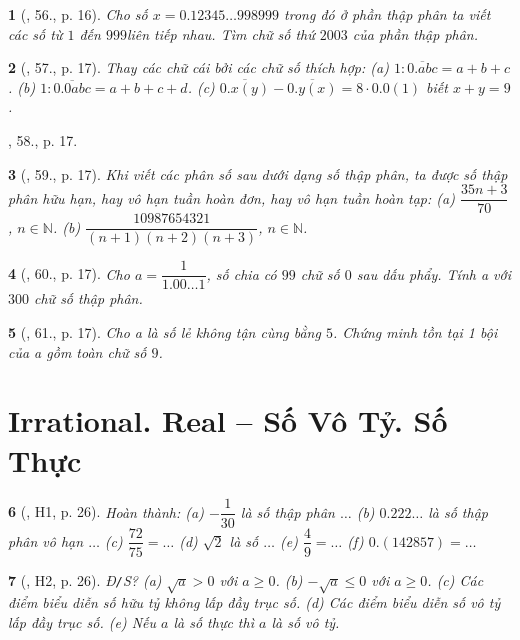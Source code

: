 \documentclass{article}
\newtheorem{baitoan}{}
\begin{document}
\begin{baitoan}[\cite{Binh_Toan_7_tap_1}, 56., p. 16]
	Cho số $x = 0.12345\ldots998999$ trong đó ở phần thập phân ta viết các số từ $1$ đến $999$liên tiếp nhau. Tìm chữ số thứ $2003$ của phần thập phân.
\end{baitoan}

\begin{baitoan}[\cite{Binh_Toan_7_tap_1}, 57., p. 17]
	Thay các chữ cái bởi các chữ số thích hợp: (a) $1:\overline{0.abc} = a + b + c$. (b) $1:\overline{0.0abc} = a + b + c + d$. (c) $\overline{0.x(y)} - \overline{0.y(x)} = 8\cdot0.0(1)$ biết $x + y = 9$.
\end{baitoan}
\cite{Binh_Toan_7_tap_1}, 58., p. 17.

\begin{baitoan}[\cite{Binh_Toan_7_tap_1}, 59., p. 17]
	Khi viết các phân số sau dưới dạng số thập phân, ta được số thập phân hữu hạn, hay vô hạn tuần hoàn đơn, hay vô hạn tuần hoàn tạp: (a) $\dfrac{35n + 3}{70}$, $n\in\mathbb{N}$. (b) $\dfrac{10987654321}{(n + 1)(n + 2)(n + 3)}$, $n\in\mathbb{N}$.
\end{baitoan}

\begin{baitoan}[\cite{Binh_Toan_7_tap_1}, 60., p. 17]
	Cho $a = \dfrac{1}{1.00\ldots1}$, số chia có $99$ chữ số $0$ sau dấu phẩy. Tính a với $300$ chữ số thập phân.
\end{baitoan}

\begin{baitoan}[\cite{Binh_Toan_7_tap_1}, 61., p. 17]
	Cho a là số lẻ không tận cùng bằng $5$. Chứng minh tồn tại 1 bội của a gồm toàn chữ số $9$.
\end{baitoan}


\section{Irrational. Real -- Số Vô Tỷ. Số Thực}

\begin{baitoan}[\cite{Binh_boi_duong_Toan_7_tap_1}, H1, p. 26]
	Hoàn thành: (a) $-\dfrac{1}{30}$ là số thập phân $\ldots$ (b) $0.222\ldots$ là số thập phân vô hạn $\ldots$ (c) $\dfrac{72}{75} = \ldots$ (d) $\sqrt{2}$ là số $\ldots$ (e) $\dfrac{4}{9} = \ldots$ (f) $0.(142857) = \ldots$
\end{baitoan}

\begin{baitoan}[\cite{Binh_boi_duong_Toan_7_tap_1}, H2, p. 26]
	{\rm Đ{\tt/}S?} (a) $\sqrt{a} > 0$ với $a\ge0$. (b) $-\sqrt{a}\le0$ với $a\ge0$. (c) Các điểm biểu diễn số hữu tỷ không lấp đầy trục số. (d) Các điểm biểu diễn số vô tỷ lấp đầy trục số. (e) Nếu $a$ là số thực thì $a$ là số vô tỷ.
\end{baitoan}
\end{document}
